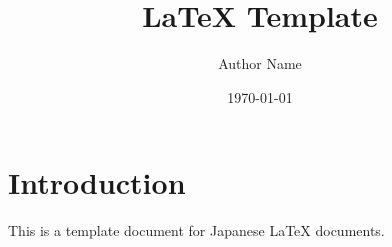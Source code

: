 \documentclass[a4paper,12pt]{ujarticle}
\begin{document}
\title{LaTeX Template}
\author{Author Name}
\date{\today}
\maketitle

\section{Introduction}

This is a template document for Japanese LaTeX documents.
\end{document}
